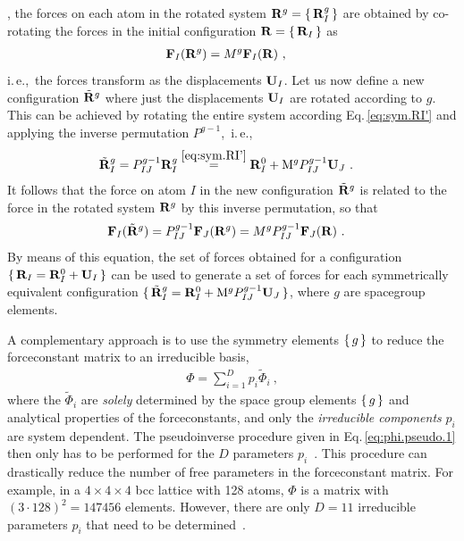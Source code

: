 , the forces on each atom in the rotated system ${\bf R}^g = \set{{\bf R}^g_I}$ are obtained by co-rotating the forces in the initial configuration ${\bf R} = \set{{\bf R}_I}$ as
\begin{align}
\b F_I (\b R^g) &= {M}^g \b F_I (\b R)~,
\label{eq:sym.Fp}
\end{align}
i.\,e.,~the forces transform as the displacements ${\bf U}_I$.
Let us now define a new configuration $\tilde{{\bf R}}^g$ where just the displacements ${\bf U}_I$ are rotated according to $g$. This can be achieved by rotating the entire system according Eq.\,\eqref{eq:sym.RI'} and applying the inverse permutation $P^{g-1}$,~i.\,e.,
\begin{align}
\tilde{{\bf R}}_I^g 
&= P^{g-1}_{IJ} {\bf R}_I^g 
\stackrel{\eqref{eq:sym.RI'}}{=} {\bf R}^0_I + {\rm M}^g P^{g-1}_{IJ} {\bf U}_J~.
\end{align}
It follows that the force on atom $I$ in the new configuration $\tilde{{\bf R}}^g$ is related to the force in the rotated system ${\bf R}^g$ by this inverse permutation, so that
\begin{align}
\b F_I (\tilde{\b R}^g) 
&= {P}^{g-1}_{IJ} \b F_J (\b R^g) 
= {M}^g  {P}^{g-1}_{IJ} \b F_J (\b R)~.
\label{eq:sym.Ftilde}
\end{align}
By means of this equation, the set of forces obtained for a configuration $\set{{\bf R}_I = {\bf R}_I^0 + {\bf U}_I}$ can be used to generate a set of forces for each symmetrically equivalent configuration $\set{\tilde{{\bf R}}_I^g = {\bf R}_I^0 + {\rm M}^g P^{g-1}_{IJ} {\bf U}_J}$, where $g$ are spacegroup elements.

A complementary approach is to use the symmetry elements $\set{g}$ to reduce the forceconstant matrix to an irreducible basis,
\begin{align}
\Phi 
= \sum_{i=1}^{D} p_i \tilde{\Phi}_i~,
\label{eq:sym.Phi.irrep.1}
\end{align}
where the $\tilde{\Phi}_i$ are \emph{solely} determined by the space group elements $\set{g}$ and analytical properties of the forceconstants, and only the \emph{irreducible components} $p_i$ are system dependent. The pseudoinverse procedure given in Eq.\,\eqref{eq:phi.pseudo.1} then only has to be performed for the $D$ parameters $p_i$~\cite{Parlinski1997}. This procedure can drastically reduce the number of free parameters in the forceconstant matrix. For example, in a $4\times4\times4$ bcc lattice with 128 atoms, $\Phi$ is a matrix with $(3 \cdot 128)^2 = 147456$ elements. However, there are only $D=11$ irreducible parameters $p_i$ that need to be determined~\cite{Hellman2013}.


